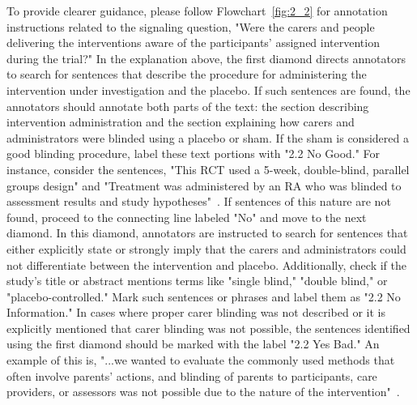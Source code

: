 \documentclass[sn-mathphys,Numbered]{sn-jnl}%
\begin{document}
To provide clearer guidance, please follow Flowchart~\ref{fig:2_2} for annotation instructions related to the signaling question, "Were the carers and people delivering the interventions aware of the participants' assigned intervention during the trial?"
In the explanation above, the first diamond directs annotators to search for sentences that describe the procedure for administering the intervention under investigation and the placebo. If such sentences are found, the annotators should annotate both parts of the text: the section describing intervention administration and the section explaining how carers and administrators were blinded using a placebo or sham. If the sham is considered a good blinding procedure, label these text portions with "2.2 No Good." For instance, consider the sentences, "This RCT used a 5-week, double-blind, parallel groups design" and "Treatment was administered by an RA who was blinded to assessment results and study hypotheses"~\cite{chiaravalloti2020efficacy}.
If sentences of this nature are not found, proceed to the connecting line labeled "No" and move to the next diamond. In this diamond, annotators are instructed to search for sentences that either explicitly state or strongly imply that the carers and administrators could not differentiate between the intervention and placebo. Additionally, check if the study's title or abstract mentions terms like "single blind," "double blind," or "placebo-controlled." Mark such sentences or phrases and label them as "2.2 No Information."
In cases where proper carer blinding was not described or it is explicitly mentioned that carer blinding was not possible, the sentences identified using the first diamond should be marked with the label "2.2 Yes Bad." An example of this is, "...we wanted to evaluate the commonly used methods that often involve parents' actions, and blinding of parents to participants, care providers, or assessors was not possible due to the nature of the intervention"~\cite{andersson2020effect}.



%
%
%
\end{document}
